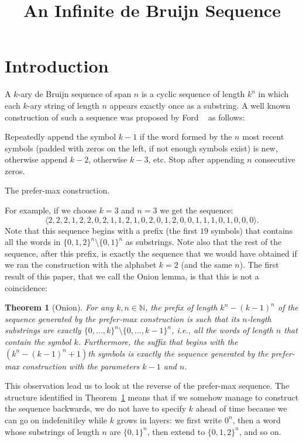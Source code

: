 \documentclass{article}
\title{An Infinite de Bruijn Sequence}
\author{}
\newtheorem{theorem}{Theorem}
\theoremstyle{definition}
\newcommand{\N}{{\mathbb{N}}}
\begin{document}
\maketitle

\section{Introduction}

A $k$-ary de Bruijn sequence of span $n$ is a cyclic sequence of length $k^n$ in which each $k$-ary string of length $n$ appears exactly once as
a substring. A well known construction of such a sequence was proposed by Ford ~\cite{Ford57} as follows:

\begin{algorithm}
Repeatedly append the symbol $k-1$ if the word formed by the $n$ most recent symbols (padded with zeros on the left, if not enough symbols exist) is new, otherwise append $k-2$, otherwise $k-3$, etc. Stop after appending $n$ consecutive zeros. 
\caption{The prefer-max construction.}
\end{algorithm}


For example, if we choose $k=3$ and $n=3$ we get the sequence:
$$\langle2,2,2,1,2,2,0,2,1,1,2,1,0,2,0,1,2,0,0,1,1,1,0,1,0,0,0\rangle.$$
Note that this sequence begins with a prefix (the first $19$ symbols) that contains all the words in $\{0,1,2\}^n \setminus \{0,1\}^n$ as substrings. Note also that the rest of the sequence, after this prefix, is exactly the sequence that we would have obtained if we ran the construction with the alphabet $k=2$ (and the same $n$). The first result of this paper, that we call the Onion lemma, is that this is not a coincidence:

\begin{theorem}[Onion]
	For any $k,n \in \N$, the prefix of length $k^n-(k-1)^n$ of the sequence generated by the prefer-max construction is such that its $n$-length substrings are exactly $\{0,\dots,k\}^n \setminus \{0,\dots,k-1\}^n$, i.e., all the words of length $n$ that contain the symbol $k$. Furthermore, the suffix that begins with the 
	$(k^n-(k-1)^n+1)$th symbols is exactly the sequence generated by the prefer-max construction with the parameters $k-1$ and $n$.
	\label{thm:onion}
\end{theorem}

This observation lead us to look at the reverse of the prefer-max sequence. The structure identified in Theorem~\ref{thm:onion} means that if we somehow manage to construct the sequence backwards, we do not have to specify $k$ ahead of time because we can go on indefenitiley while $k$ grows in layers: we first write $0^n$, then a word whose substrings of length $n$ are $\{0,1\}^n$, then extend to $\{0,1,2\}^n$, and so on.
\end{document}
